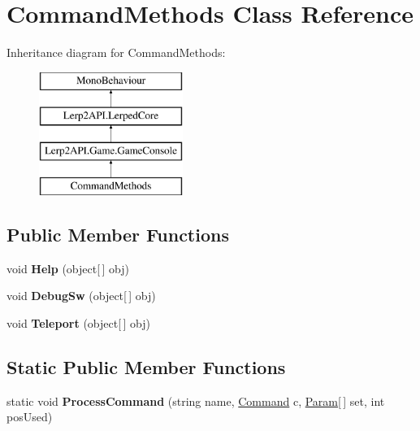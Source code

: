 \hypertarget{class_command_methods}{}\section{Command\+Methods Class Reference}
\label{class_command_methods}
Inheritance diagram for Command\+Methods\+:\begin{figure}[H]
\begin{center}
\leavevmode
\includegraphics[height=4.000000cm]{class_command_methods}
\end{center}
\end{figure}
\subsection*{Public Member Functions}
\begin{DoxyCompactItemize}
\item 
\mbox{\label{class_command_methods_a28f74ac49ae31b888b9917c73982bda2}} 
void {\bfseries Help} (object\mbox{[}$\,$\mbox{]} obj)
\item 
\mbox{\label{class_command_methods_ac8836c23d6d7d6dc387e07200ed966a2}} 
void {\bfseries Debug\+Sw} (object\mbox{[}$\,$\mbox{]} obj)
\item 
\mbox{\label{class_command_methods_a68f64d907d6b8b2348b3ec9960aac399}} 
void {\bfseries Teleport} (object\mbox{[}$\,$\mbox{]} obj)
\end{DoxyCompactItemize}
\subsection*{Static Public Member Functions}
\begin{DoxyCompactItemize}
\item 
\mbox{\label{class_command_methods_a320048e79589448c4948871452ca4cdb}} 
static void {\bfseries Process\+Command} (string name, \hyperlink{class_lerp2_a_p_i_1_1_game_1_1_command}{Command} c, \hyperlink{class_lerp2_a_p_i_1_1_game_1_1_param}{Param}\mbox{[}$\,$\mbox{]} set, int pos\+Used)
\end{DoxyCompactItemize}
